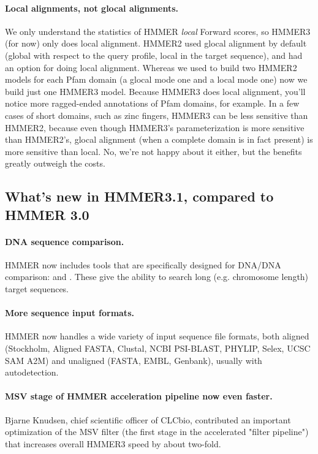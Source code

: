 \paragraph{Local alignments, not glocal alignments.} We only
understand the statistics of HMMER \emph{local} Forward scores, so
HMMER3 (for now) only does local alignment. HMMER2 used glocal
alignment by default (global with respect to the query profile, local
in the target sequence), and had an option for doing local alignment.
Whereas we used to build two HMMER2 models for each Pfam domain (a
glocal mode one and a local mode one) now we build just one HMMER3
model.  Because HMMER3 does local alignment, you'll notice more
ragged-ended annotations of Pfam domains, for example. In a few cases
of short domains, such as zinc fingers, HMMER3 can be less sensitive
than HMMER2, because even though HMMER3's parameterization is more
sensitive than HMMER2's, glocal alignment (when a complete domain is
in fact present) is more sensitive than local. No, we're not happy
about it either, but the benefits greatly outweigh the costs.


\subsection{What's new in HMMER3.1, compared to HMMER 3.0}

\paragraph{DNA sequence comparison.} HMMER now includes tools that are
specifically designed for DNA/DNA comparison:  and
. These give the ability to search long
(e.g. chromosome length) target sequences.

\paragraph{More sequence input formats.} HMMER now handles a wide variety of
input sequence file formats, both aligned (Stockholm, Aligned FASTA, Clustal,
NCBI PSI-BLAST, PHYLIP, Selex, UCSC SAM A2M) and unaligned (FASTA, EMBL,
Genbank), usually with autodetection.

\paragraph{MSV stage of HMMER acceleration pipeline now even faster.}
 Bjarne Knudsen, chief scientific officer of CLCbio, contributed an
 important optimization of the MSV filter (the first stage in the
 accelerated "filter pipeline") that increases overall HMMER3 speed by
 about two-fold. 

